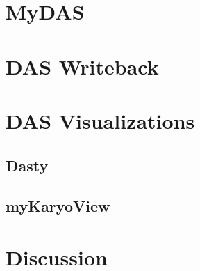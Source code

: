 \textbf{}



\section{MyDAS}
\section{DAS Writeback}
\section{DAS Visualizations}
\subsection{Dasty}
\subsection{myKaryoView}
\section{Discussion}
